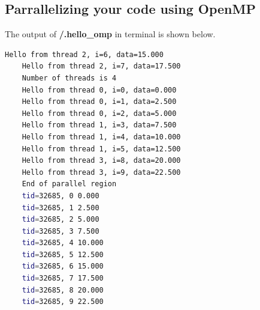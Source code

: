 \documentclass[letterpaper,10pt]{article}
\begin{document}
\subsection{Parrallelizing your code using OpenMP}
The output of \textbf{/.hello\_omp} in terminal is shown below. 
{\small\begin{framed}
  \begin{lstlisting}[language=bash]
    Hello from thread 2, i=6, data=15.000
    Hello from thread 2, i=7, data=17.500
    Number of threads is 4
    Hello from thread 0, i=0, data=0.000
    Hello from thread 0, i=1, data=2.500
    Hello from thread 0, i=2, data=5.000
    Hello from thread 1, i=3, data=7.500
    Hello from thread 1, i=4, data=10.000
    Hello from thread 1, i=5, data=12.500
    Hello from thread 3, i=8, data=20.000
    Hello from thread 3, i=9, data=22.500
    End of parallel region
    tid=32685, 0 0.000
    tid=32685, 1 2.500
    tid=32685, 2 5.000
    tid=32685, 3 7.500
    tid=32685, 4 10.000
    tid=32685, 5 12.500
    tid=32685, 6 15.000
    tid=32685, 7 17.500
    tid=32685, 8 20.000
    tid=32685, 9 22.500
    \end{lstlisting}
  \end{framed}}
\end{document}
